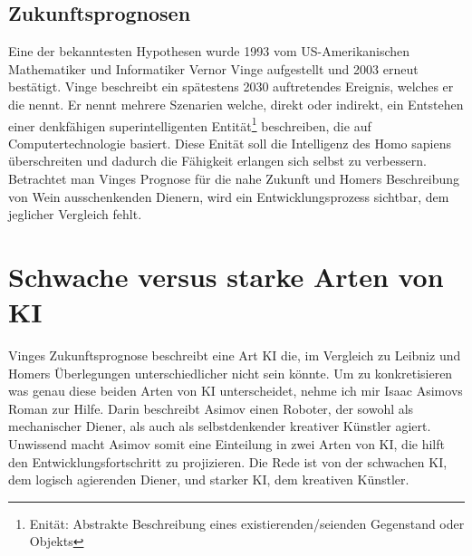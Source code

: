 \documentclass[12pt,german,ngerman]{report}
\begin{document}
    \section{Zukunftsprognosen}
        Eine der bekanntesten Hypothesen wurde 1993 vom US-Amerikanischen Mathematiker und 
        Informatiker Vernor Vinge aufgestellt und 2003
        erneut bestätigt. Vinge beschreibt ein spätestens 2030 auftretendes Ereignis, 
        welches er die \cite[1]{vinge1993technological} nennt. 
        Er nennt mehrere Szenarien welche, direkt oder indirekt, 
        ein Entstehen einer denkfähigen superintelligenten Entität\footnote{Enität: Abstrakte Beschreibung eines existierenden/seienden Gegenstand oder Objekts}
        beschreiben, die auf Computertechnologie basiert.
        Diese Enität soll die Intelligenz des Homo sapiens überschreiten und dadurch die Fähigkeit erlangen sich selbst zu verbessern.\\
        
        Betrachtet man Vinges Prognose für die nahe Zukunft
        und Homers Beschreibung von Wein ausschenkenden Dienern,
        wird ein Entwicklungsprozess sichtbar, dem jeglicher Vergleich fehlt.




\chapter{Schwache versus starke Arten von KI}
    Vinges Zukunftsprognose\cite[1]{vinge1993technological} beschreibt eine Art KI die,
    im Vergleich zu Leibniz und Homers Überlegungen unterschiedlicher nicht sein könnte.
    Um zu konkretisieren was genau diese beiden Arten von KI unterscheidet, nehme ich
    mir Isaac Asimovs Roman  zur Hilfe.
    Darin beschreibt Asimov einen Roboter, der sowohl als mechanischer Diener, als
    auch als selbstdenkender kreativer Künstler agiert.\cite{asimov2000der}
    Unwissend macht Asimov somit eine Einteilung in zwei Arten von KI,
    die hilft den Entwicklungsfortschritt zu projizieren.
    Die Rede ist von der schwachen KI, dem logisch agierenden Diener, und
    starker KI, dem kreativen Künstler.
\end{document}

